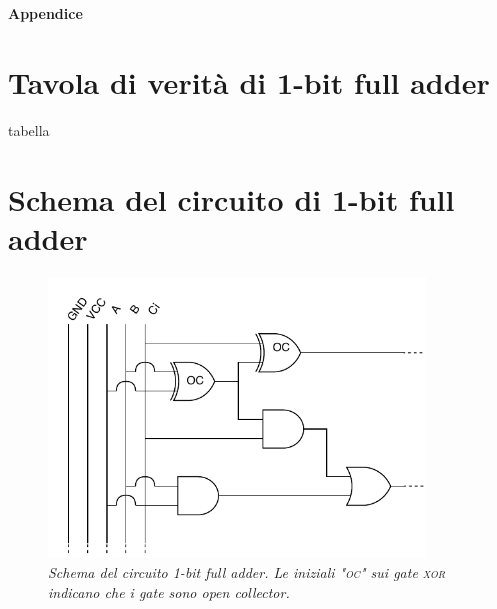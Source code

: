 \appendix
  \textbf{\huge{Appendice}}
  \section{Tavola di verità di 1-bit full adder}\label{sec:1bfa-tavola}
  tabella
  \section{Schema del circuito di 1-bit full adder}\label{sec:1bfa-circuito}
    \begin{figure}[h]
      \centering
      \includegraphics[width=10cm]{../assets/1bfa.drawio.pdf}
      \caption{
        \emph{
          Schema del circuito 1-bit full adder. Le iniziali "\textsc{oc}" sui gate \textsc{xor} indicano che i gate sono
          \emph{open collector}.
        }
      }
      \label{fig:circuito}
    \end{figure} %
